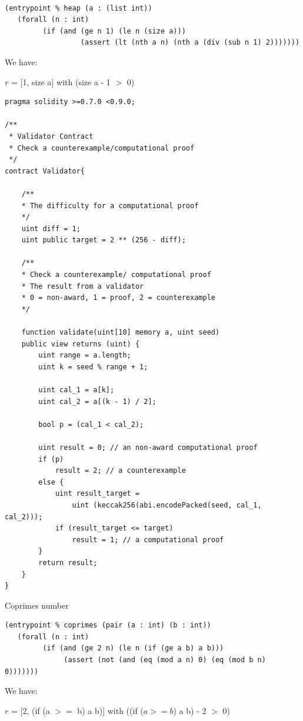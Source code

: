 \documentclass[runningheads]{llncs}
\begin{document}
\begin{lstlisting}[numbers=none]

(entrypoint % heap (a : (list int))
   (forall (n : int)
         (if (and (ge n 1) (le n (size a)))
                  (assert (lt (nth a n) (nth a (div (sub n 1) 2)))))))
\end{lstlisting}


\noindent We have:

$r$ = [1, size a] with (size a - 1 $>$ 0)


\begin{lstlisting}[numbers=none]
pragma solidity >=0.7.0 <0.9.0;

/**
 * Validator Contract
 * Check a counterexample/computational proof
 */
contract Validator{

    /**
    * The difficulty for a computational proof
    */
    uint diff = 1;
    uint public target = 2 ** (256 - diff); 

    /**
    * Check a counterexample/ computational proof
    * The result from a validator
    * 0 = non-award, 1 = proof, 2 = counterexample
    */

    function validate(uint[10] memory a, uint seed) 
    public view returns (uint) {
        uint range = a.length; 
        uint k = seed % range + 1;

        uint cal_1 = a[k];
        uint cal_2 = a[(k - 1) / 2];
        
        bool p = (cal_1 < cal_2);

        uint result = 0; // an non-award computational proof 
        if (p)  
            result = 2; // a counterexample
        else {
            uint result_target = 
                uint (keccak256(abi.encodePacked(seed, cal_1, cal_2)));
            if (result_target <= target) 
                result = 1; // a computational proof      
        }              
        return result;           
    }
}

\end{lstlisting}

Coprimes number

\begin{lstlisting}[numbers=none]
(entrypoint % coprimes (pair (a : int) (b : int))
   (forall (n : int)
         (if (and (ge 2 n) (le n (if (ge a b) a b)))
              (assert (not (and (eq (mod a n) 0) (eq (mod b n) 0)))))))
\end{lstlisting}


\noindent We have:

$r$ = [2, (if (a $>=$ b) a b)] with ((if ($a >= b$) a b) - 2 $>$ 0)
\end{document}
